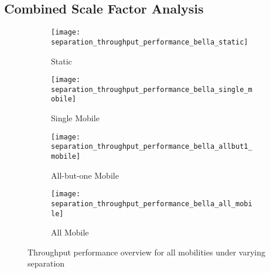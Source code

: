 \subsection{Combined Scale Factor Analysis}
\begin{figure}[h]
	\begin{subfigure}[t]{0.5\textwidth}
		\centering
		\texttt{[image: separation\_throughput\_performance\_bella\_static]}
		\caption{Static}
		\label{fig:separation_throughput_performance_sum_bella_static}
	\end{subfigure}
	\begin{subfigure}[t]{0.5\textwidth}
		\centering
		\texttt{[image: separation\_throughput\_performance\_bella\_single\_mobile]}
		\caption{Single Mobile}
		\label{fig:separation_throughput_performance_sum_bella_single_mobile}
	\end{subfigure}
	
	\begin{subfigure}[t]{0.5\textwidth}
		\centering
		\texttt{[image: separation\_throughput\_performance\_bella\_allbut1\_mobile]}
		\caption{All-but-one Mobile}
		\label{fig:separation_throughput_performance_sum_bella_allbut1_mobile}
	\end{subfigure}  
	\begin{subfigure}[t]{0.5\textwidth}
		\centering
		\texttt{[image: separation\_throughput\_performance\_bella\_all\_mobile]}
		\caption{All Mobile}
		\label{fig:separation_throughput_performance_sum_bella_all_mobile}
	\end{subfigure}  
	\caption{Throughput performance overview for all mobilities under varying separation}
	\label{fig:separation_all}
\end{figure}

